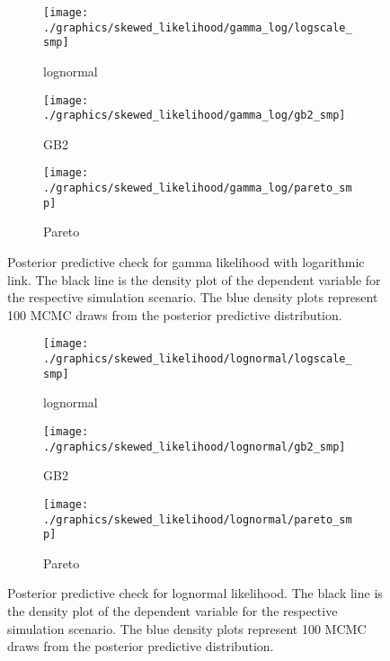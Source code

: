 \begin{figure}[t]
    \centering
    \begin{subfigure}{0.29\textwidth}
        \texttt{[image: ./graphics/skewed\_likelihood/gamma\_log/logscale\_smp]}
        \caption{lognormal}
    \end{subfigure}
    \begin{subfigure}{0.29\textwidth}
        \texttt{[image: ./graphics/skewed\_likelihood/gamma\_log/gb2\_smp]}
        \caption{GB2}
    \end{subfigure}
    \begin{subfigure}{0.29\textwidth}
        \texttt{[image: ./graphics/skewed\_likelihood/gamma\_log/pareto\_smp]}
        \caption{Pareto}
    \end{subfigure}

    \caption[Posterior predictive check for gamma likelihood]{Posterior predictive check for gamma likelihood with logarithmic link. The black line is the density plot of the dependent variable for the respective simulation scenario. The blue density plots represent 100 MCMC draws from the posterior predictive distribution.}
    \label{fig:gamma_ppc}
\end{figure}

\begin{figure}[h]
    \centering
    \begin{subfigure}{0.29\textwidth}
        \texttt{[image: ./graphics/skewed\_likelihood/lognormal/logscale\_smp]}
        \caption{lognormal}
    \end{subfigure}
    \begin{subfigure}{0.29\textwidth}
        \texttt{[image: ./graphics/skewed\_likelihood/lognormal/gb2\_smp]}
        \caption{GB2}
    \end{subfigure}
    \begin{subfigure}{0.29\textwidth}
        \texttt{[image: ./graphics/skewed\_likelihood/lognormal/pareto\_smp]}
        \caption{Pareto}
    \end{subfigure}

    \caption[Posterior predictive check for lognormal likelihood]{Posterior predictive check for lognormal likelihood. The black line is the density plot of the dependent variable for the respective simulation scenario. The blue density plots represent 100 MCMC draws from the posterior predictive distribution.}
    \label{fig:lognormal_ppc}
\end{figure}


